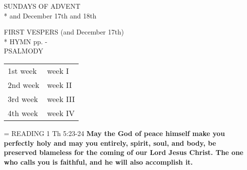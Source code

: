 \pagebreak
\begin{center}\normalsize{\uppercase{Sundays of Advent\\*}}
\footnotesize{and December 17th and 18th}\end{center}
\noindent\normalsize{\uppercase{First Vespers}}\small{ (and December 17th)\\*}
\indent\uppercase{Hymn} pp. \pageref{advent:firstHymn}-\pageref{advent:lastHymn}\\
\indent\small{\uppercase{Psalmody}}
\begin{center}
\begin{tabular}{ l l }
1st week & week I\\
2nd week & week II\\
3rd week & week III\\
4th week & week IV\\
\end{tabular}
\end{center}

\leftskip=\parindent
\noindent\small{\uppercase{Reading}} 1 Th 5:23-24 \textbf{May the God of peace himself make you perfectly holy and may you entirely, spirit, soul, and body, be preserved blameless for the coming of our Lord Jesus Christ. The one who calls you is faithful, and he will also accomplish it.\\}

